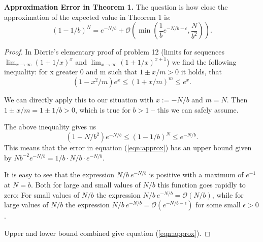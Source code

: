 {\bf Approximation Error in Theorem 1.} The question is how close the approximation of the expected value in Theorem 1 is:
\begin{equation}\label{eqn:approx}
(1- 1/b)^N = e^{-N/b} + {\mathcal O}\left( \min\left(\frac{1}{b} e^{-N/b-\epsilon}, \frac{N}{b^2}\right)\right).
\end{equation}

\begin{proof}
In D\"orrie's elementary proof of problem 12  \cite{doerrie} (limits for sequences $\lim_{x \rightarrow \infty} (1+1/x)^x$ and $\lim_{x \rightarrow \infty} (1+1/x)^{x+1}$) we find the following inequality:
 for x greater 0 and m such that $1 \pm x/m > 0$ it holds, that
\[
(1-x^2/m) e^x \le (1 + x/m)^m \le e^x.
\]

We can directly apply this to our situation with
 $x := -N/b$ and $m = N$. Then $1 \pm x/m = 1 \pm 1/b > 0$, which is true for $b > 1$ -- this we can safely assume.
 
The above inequality gives us
\[
(1-N/b^2) e^{-N/b} \le (1 -1/b)^N \le e^{-N/b}.
\]
This means that the error in equation (\ref{eqn:approx}) has an upper bound given by $Nb^{-2} e^{-N/b} = 1/b \cdot N/b \cdot e^{-N/b}$.

It is easy to see that the expression $N/b \ e^{-N/b}$ is positive with a maximum of $e^{-1}$ at $N = b$. Both for large and small values of $N/b$ this function goes rapidly to zero: 
For small values of $N/b$ the expression  $N/b \ e^{-N/b} = {\mathcal O}(N/b)$, while for large values of $N/b$ the expression  $N/b \ e^{-N/b} = {\mathcal O}(e^{-N/b-\epsilon})$ for some small $\epsilon > 0$.

Upper and lower bound combined  give equation (\ref{eqn:approx}).
\end{proof}
